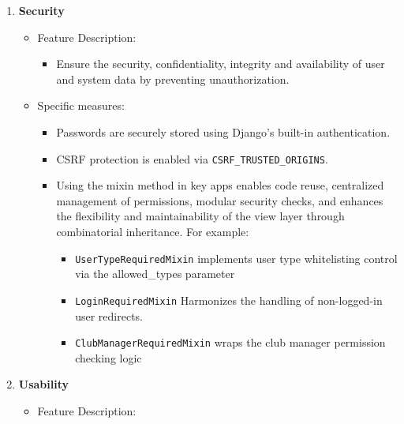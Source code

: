 \begin{enumerate}
    \def\labelenumi{\arabic{enumi}.}
    \item
      \textbf{Security}
    
      \begin{itemize}
      \item
        Feature Description:
    
        \begin{itemize}
        \item
          Ensure the security, confidentiality, integrity and availability
          of user and system data by preventing unauthorization.
        \end{itemize}
      \item
        Specific measures:
    
        \begin{itemize}
        \item
          Passwords are securely stored using Django's built-in
          authentication.
        \item
          CSRF protection is enabled via \texttt{CSRF\_TRUSTED\_ORIGINS}.
        \item
          Using the mixin method in key apps enables code reuse, centralized
          management of permissions, modular security checks, and enhances
          the flexibility and maintainability of the view layer through
          combinatorial inheritance. For example:
    
          \begin{itemize}
          \item
            \texttt{UserTypeRequiredMixin} implements user type whitelisting
            control via the allowed\_types parameter
          \item
            \texttt{LoginRequiredMixin} Harmonizes the handling of
            non-logged-in user redirects.
          \item
            \texttt{ClubManagerRequiredMixin} wraps the club manager
            permission checking logic
          \end{itemize}
        \end{itemize}
      \end{itemize}
    \item
      \textbf{Usability}
    
      \begin{itemize}
      \item
        Feature Description:
    

\end{itemize}
\end{enumerate}
